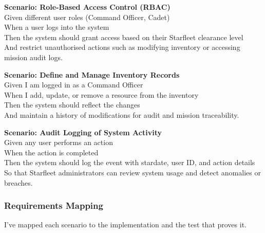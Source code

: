 \documentclass[12pt,a4paper]{article}
\begin{document}
\vspace{0.5em}
\noindent
\textbf{Scenario: Role-Based Access Control (RBAC)}\\
Given different user roles (Command Officer, Cadet)\\
When a user logs into the system\\
Then the system should grant access based on their Starfleet clearance level\\
And restrict unauthorised actions such as modifying inventory or accessing mission audit logs.

\vspace{0.5em}
\noindent
\textbf{Scenario: Define and Manage Inventory Records}\\
Given I am logged in as a Command Officer\\
When I add, update, or remove a resource from the inventory\\
Then the system should reflect the changes\\
And maintain a history of modifications for audit and mission traceability.

\vspace{0.5em}
\noindent
\textbf{Scenario: Audit Logging of System Activity}\\
Given any user performs an action\\
When the action is completed\\
Then the system should log the event with stardate, user ID, and action details\\
So that Starfleet administrators can review system usage and detect anomalies or breaches.

\subsubsection{Requirements Mapping}

I've mapped each scenario to the implementation and the test that proves it.
\end{document}
